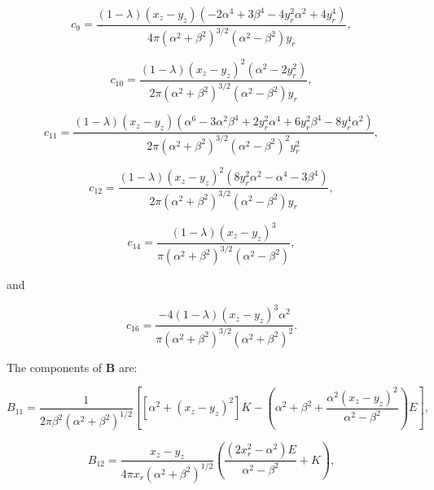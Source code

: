 \documentclass[12pt]{article}
\begin{document}
\begin{equation}
\label{equ:coeff_a9}
c_{9} = \frac{(1 - \lambda) (x_{z} - y_{z}) (-2 \alpha^{4} + 3 \beta^{4} - 4 y_{r}^{2} \alpha^{2} + 4 y_{r}^{4})}{4 \pi (\alpha^{2} + \beta^{2})^{3/2} (\alpha^{2} - \beta^{2}) y_{r}},
\end{equation}

\begin{equation}
\label{equ:coeff_a10}
c_{10} = \frac{(1 - \lambda) (x_{z} - y_{z})^{2} (\alpha^{2} - 2 y_{r}^{2})}{2 \pi (\alpha^{2} + \beta^{2})^{3/2} (\alpha^{2} - \beta^{2}) y_{r}},
\end{equation}

\begin{equation}
\label{equ:coeff_a11}
c_{11} = \frac{(1 - \lambda) (x_{z} - y_{z}) (\alpha^{6} - 3 \alpha^{2} \beta^{4} + 2 y_{r}^{2} \alpha^{4} + 6 y_{r}^{2} \beta^{4} - 8 y_{r}^{4} \alpha^{2})}{2 \pi (\alpha^{2} + \beta^{2})^{3/2} (\alpha^{2} - \beta^{2})^{2} y_{r}^{2}},
\end{equation}

\begin{equation}
\label{equ:coeff_a12}
c_{12} = \frac{(1 - \lambda) (x_{z} - y_{z})^{2} (8 y_{r}^{2} \alpha^{2} - \alpha^{4} - 3 \beta^{4})}{2 \pi (\alpha^{2} + \beta^{2})^{3/2} (\alpha^{2} - \beta^{2}) y_{r}},
\end{equation}

\begin{equation}
\label{equ:coeff_a14}
c_{14} = \frac{(1 - \lambda) (x_{z} - y_{z})^{3}}{\pi (\alpha^{2} + \beta^{2})^{3/2} (\alpha^{2} - \beta^{2})},
\end{equation}

and 

\begin{equation}
\label{equ:coeff_a16}
c_{16} = \frac{-4 (1 - \lambda) (x_{z} - y_{z})^{3} \alpha^{2}}{\pi (\alpha^{2} + \beta^{2})^{3/2} (\alpha^{2} + \beta^{2})^{2}}.
\end{equation}

The components of $\boldsymbol{B}$ are:

\begin{equation}
\label{equ:B11_comp}
B_{11} = \frac{1}{2 \pi \beta^{2} (\alpha^{2} + \beta^{2})^{1/2}} \left[ [\alpha^{2} + (x_{z} - y_{z})^{2}] K - \left( \alpha^{2} + \beta^{2} + \frac{\alpha^{2} (x_{z} - y_{z})^{2}}{\alpha^{2} - \beta^{2}}\right) E\right],
\end{equation}


\begin{equation}
\label{equ:B12_comp}
B_{12} = \frac{x_{z} - y_{z}}{4 \pi x_{r} (\alpha^{2} + \beta^{2})^{1/2}} \left( \frac{(2 x_{r}^{2} - \alpha^{2}) E}{\alpha^{2} - \beta^{2}} + K \right),
\end{equation}
\end{document}
